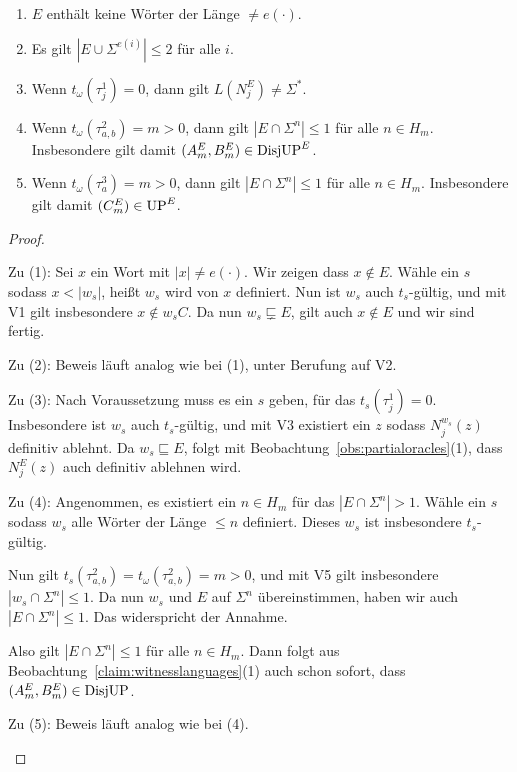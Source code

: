 \begin{claim}\label{claim:myoracle-structure}
    \begin{enumerate}[midpenalty=0,beginpenalty=0,endpenalty=0]
        \item $E$ enthält keine Wörter der Länge $\neq e(\cdot)$.
        \item Es gilt $|E\cup\Sigma^{e(i)}|\leq 2$ für alle $i$.
        \item Wenn $t_\omega(\tau^1_j)=0$, dann gilt $L(N_j^E)\neq\Sigma^*$.
        \item Wenn $t_\omega(\tau^2_{a,b})=m>0$, dann gilt $|E\cap \Sigma^n|\leq 1$ für alle $n\in H_m$. Insbesondere gilt damit $(A_m^E, B_m^E)\in\mathrm{DisjUP}^E$.
        \item Wenn $t_\omega(\tau^3_{a})=m>0$, dann gilt $|E\cap \Sigma^n|\leq 1$ für alle $n\in H_m$. Insbesondere gilt damit $(C_m^E)\in\mathrm{UP}^E$.
    \end{enumerate}
\end{claim}
\begin{proof}
    \begin{prooflist}
    \item Zu (1): Sei $x$ ein Wort mit $|x|\neq e(\cdot)$. Wir zeigen dass $x\not\in E$.  Wähle ein $s$ sodass $x<|w_s|$, heißt $w_s$ wird von $x$ definiert. Nun ist $w_s$ auch $t_s$-gültig, und mit V1 gilt insbesondere $x\not\in w_sC$.
        Da nun $w_s\sqsubsetneq E$, gilt auch $x\not\in E$ und wir sind fertig.
        
    \item Zu (2): Beweis läuft analog wie bei (1), unter Berufung auf V2.

    \item Zu (3): Nach Voraussetzung muss es ein $s$ geben, für das $t_s(\tau^1_j)=0$. Insbesondere ist $w_s$ auch $t_s$-gültig, und mit V3 existiert ein $z$ sodass $N_j^{w_s}(z)$ definitiv ablehnt.
        Da $w_s\sqsubseteq E$, folgt mit Beobachtung~\ref{obs:partialoracles}(1), dass $N_j^E(z)$ auch definitiv ablehnen wird.

    \item Zu (4): Angenommen, es existiert ein $n\in H_m$ für das $|E\cap\Sigma^n|>1$.
        Wähle ein $s$ sodass $w_s$ alle Wörter der Länge $\leq n$ definiert. Dieses $w_s$ ist insbesondere $t_s$-gültig.

        Nun gilt $t_s(\tau^2_{a,b})=t_\omega(\tau^2_{a,b})=m>0$, und mit V5 gilt insbesondere $|w_s\cap\Sigma^n|\leq 1$.
        Da nun $w_s$ und $E$ auf $\Sigma^{n}$ übereinstimmen, haben wir auch $|E\cap\Sigma^n|\leq 1$. Das widerspricht der Annahme.

        Also gilt $|E\cap\Sigma^n|\leq 1$ für alle $n\in H_m$. Dann folgt aus Beobachtung~\ref{claim:witnesslanguages}(1) auch schon sofort, dass $(A_m^E, B_m^E)\in\mathrm{DisjUP}$.

    \item Zu (5): Beweis läuft analog wie bei (4).
    \end{prooflist}
\end{proof}

